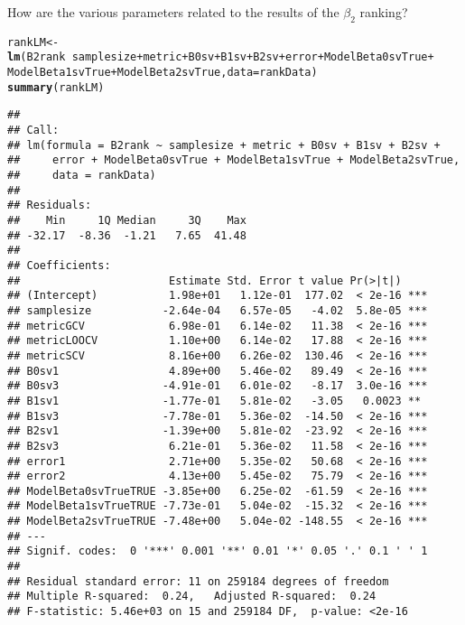 \documentclass{article}\usepackage[]{graphicx}\usepackage[]{color}
\makeatletter
\newcommand{\hlopt}[1]{\textcolor[rgb]{0,0,0}{#1}}%
\newcommand{\hlstd}[1]{\textcolor[rgb]{0.345,0.345,0.345}{#1}}%
\newcommand{\hlkwb}[1]{\textcolor[rgb]{0.69,0.353,0.396}{#1}}%
\newcommand{\hlkwc}[1]{\textcolor[rgb]{0.333,0.667,0.333}{#1}}%
\newcommand{\hlkwd}[1]{\textcolor[rgb]{0.737,0.353,0.396}{\textbf{#1}}}%
\newenvironment{kframe}{%
 \def\at@end@of@kframe{}%
 \ifinner\ifhmode%
  \def\at@end@of@kframe{\end{minipage}}%
  \begin{minipage}{\columnwidth}%
 \fi\fi%
 \def\FrameCommand##1{\hskip\@totalleftmargin \hskip-\fboxsep
 \colorbox{shadecolor}{##1}\hskip-\fboxsep
     \hskip-\linewidth \hskip-\@totalleftmargin \hskip\columnwidth}%
 \MakeFramed {\advance\hsize-\width
   \@totalleftmargin\z@ \linewidth\hsize
   \@setminipage}}%
 {\par\unskip\endMakeFramed%
 \at@end@of@kframe}
\newenvironment{knitrout}{}{} %
\makeatother
\begin{document}
How are the various parameters related to the results of the $\beta _2$ ranking?
\begin{knitrout}
\color{fgcolor}\begin{kframe}
\begin{alltt}
\hlstd{rankLM} \hlkwb{<-} \hlkwd{lm}\hlstd{(B2rank} \hlopt{~} \hlstd{samplesize} \hlopt{+} \hlstd{metric} \hlopt{+} \hlstd{B0sv} \hlopt{+} \hlstd{B1sv} \hlopt{+} \hlstd{B2sv} \hlopt{+} \hlstd{error} \hlopt{+} \hlstd{ModelBeta0svTrue} \hlopt{+}
    \hlstd{ModelBeta1svTrue} \hlopt{+} \hlstd{ModelBeta2svTrue,} \hlkwc{data} \hlstd{= rankData)}
\hlkwd{summary}\hlstd{(rankLM)}
\end{alltt}
\begin{verbatim}
## 
## Call:
## lm(formula = B2rank ~ samplesize + metric + B0sv + B1sv + B2sv + 
##     error + ModelBeta0svTrue + ModelBeta1svTrue + ModelBeta2svTrue, 
##     data = rankData)
## 
## Residuals:
##    Min     1Q Median     3Q    Max 
## -32.17  -8.36  -1.21   7.65  41.48 
## 
## Coefficients:
##                       Estimate Std. Error t value Pr(>|t|)    
## (Intercept)           1.98e+01   1.12e-01  177.02  < 2e-16 ***
## samplesize           -2.64e-04   6.57e-05   -4.02  5.8e-05 ***
## metricGCV             6.98e-01   6.14e-02   11.38  < 2e-16 ***
## metricLOOCV           1.10e+00   6.14e-02   17.88  < 2e-16 ***
## metricSCV             8.16e+00   6.26e-02  130.46  < 2e-16 ***
## B0sv1                 4.89e+00   5.46e-02   89.49  < 2e-16 ***
## B0sv3                -4.91e-01   6.01e-02   -8.17  3.0e-16 ***
## B1sv1                -1.77e-01   5.81e-02   -3.05   0.0023 ** 
## B1sv3                -7.78e-01   5.36e-02  -14.50  < 2e-16 ***
## B2sv1                -1.39e+00   5.81e-02  -23.92  < 2e-16 ***
## B2sv3                 6.21e-01   5.36e-02   11.58  < 2e-16 ***
## error1                2.71e+00   5.35e-02   50.68  < 2e-16 ***
## error2                4.13e+00   5.45e-02   75.79  < 2e-16 ***
## ModelBeta0svTrueTRUE -3.85e+00   6.25e-02  -61.59  < 2e-16 ***
## ModelBeta1svTrueTRUE -7.73e-01   5.04e-02  -15.32  < 2e-16 ***
## ModelBeta2svTrueTRUE -7.48e+00   5.04e-02 -148.55  < 2e-16 ***
## ---
## Signif. codes:  0 '***' 0.001 '**' 0.01 '*' 0.05 '.' 0.1 ' ' 1
## 
## Residual standard error: 11 on 259184 degrees of freedom
## Multiple R-squared:  0.24,	Adjusted R-squared:  0.24 
## F-statistic: 5.46e+03 on 15 and 259184 DF,  p-value: <2e-16
\end{verbatim}
\end{kframe}
\end{knitrout}
\end{document}
